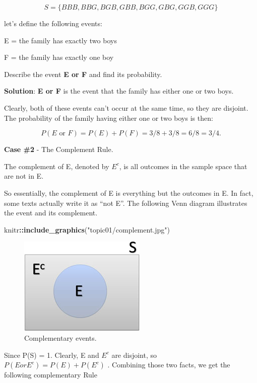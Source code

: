 \documentclass[
]{book}
\newenvironment{Shaded}{\begin{snugshade}}{\end{snugshade}}
\newcommand{\FunctionTok}[1]{\textcolor[rgb]{0.13,0.29,0.53}{\textbf{#1}}}
\newcommand{\NormalTok}[1]{#1}
\newcommand{\SpecialCharTok}[1]{\textcolor[rgb]{0.81,0.36,0.00}{\textbf{#1}}}
\newcommand{\StringTok}[1]{\textcolor[rgb]{0.31,0.60,0.02}{#1}}
\begin{document}
\[S = \{ BBB, BBG, BGB, GBB, BGG, GBG, GGB, GGG\}\]

let's define the following events:

E = the family has exactly two boys

F = the family has exactly one boy

Describe the event \textbf{E or F} and find its probability.

\textbf{Solution}: \textbf{E or F} is the event that the family has either one or two boys.

Clearly, both of these events can't occur at the same time, so they are disjoint. The probability of the family having either one or two boys is then:

\[P(E \mbox{ or } F) = P(E) + P(F) = 3/8 + 3/8 = 6/8 = 3/4.\]

\textbf{Case \#2} - The Complement Rule.

The complement of E, denoted by \(E^c\), is all outcomes in the sample space that are not in E.

So essentially, the complement of E is everything but the outcomes in E. In fact, some texts actually write it as ``not E''. The following Venn diagram illustrates the event and its complement.

\begin{Shaded}
\begin{Highlighting}[]
\NormalTok{knitr}\SpecialCharTok{::}\FunctionTok{include\_graphics}\NormalTok{(}\StringTok{"topic01/complement.jpg"}\NormalTok{)}
\end{Highlighting}
\end{Shaded}

\begin{figure}

{\centering \includegraphics[width=0.3\linewidth]{topic01/complement} 

}

\caption{Complementary events.}\label{fig:unnamed-chunk-25}
\end{figure}

Since P(S) = 1. Clearly, E and \(E^c\) are disjoint, so \(P(E or E^c) = P(E) + P(E^c)\) . Combining those two facts, we get the following complementary Rule
\end{document}

